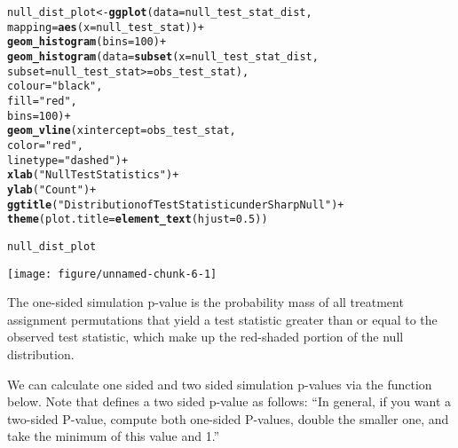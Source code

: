 \documentclass[11pt]{article}\usepackage[]{graphicx}\usepackage[]{color}
\makeatletter
\def\maxwidth{ %
  \ifdim\Gin@nat@width>\linewidth
    \linewidth
  \else
    \Gin@nat@width
  \fi
}
\newcommand{\hlnum}[1]{\textcolor[rgb]{0.686,0.059,0.569}{#1}}%
\newcommand{\hlstr}[1]{\textcolor[rgb]{0.192,0.494,0.8}{#1}}%
\newcommand{\hlopt}[1]{\textcolor[rgb]{0,0,0}{#1}}%
\newcommand{\hlstd}[1]{\textcolor[rgb]{0.345,0.345,0.345}{#1}}%
\newcommand{\hlkwb}[1]{\textcolor[rgb]{0.69,0.353,0.396}{#1}}%
\newcommand{\hlkwc}[1]{\textcolor[rgb]{0.333,0.667,0.333}{#1}}%
\newcommand{\hlkwd}[1]{\textcolor[rgb]{0.737,0.353,0.396}{\textbf{#1}}}%
\newenvironment{kframe}{%
 \def\at@end@of@kframe{}%
 \ifinner\ifhmode%
  \def\at@end@of@kframe{\end{minipage}}%
  \begin{minipage}{\columnwidth}%
 \fi\fi%
 \def\FrameCommand##1{\hskip\@totalleftmargin \hskip-\fboxsep
 \colorbox{shadecolor}{##1}\hskip-\fboxsep
     \hskip-\linewidth \hskip-\@totalleftmargin \hskip\columnwidth}%
 \MakeFramed {\advance\hsize-\width
   \@totalleftmargin\z@ \linewidth\hsize
   \@setminipage}}%
 {\par\unskip\endMakeFramed%
 \at@end@of@kframe}
\newenvironment{knitrout}{}{} %
\theoremstyle{newstyle}
\makeatother
\begin{document}
\begin{knitrout}
\begin{kframe}
\begin{alltt}
\hlstd{null_dist_plot} \hlkwb{<-} \hlkwd{ggplot}\hlstd{(}\hlkwc{data} \hlstd{= null_test_stat_dist,}
                         \hlkwc{mapping} \hlstd{=} \hlkwd{aes}\hlstd{(}\hlkwc{x} \hlstd{= null_test_stat))} \hlopt{+}
  \hlkwd{geom_histogram}\hlstd{(}\hlkwc{bins} \hlstd{=} \hlnum{100}\hlstd{)} \hlopt{+}
  \hlkwd{geom_histogram}\hlstd{(}\hlkwc{data} \hlstd{=} \hlkwd{subset}\hlstd{(}\hlkwc{x} \hlstd{= null_test_stat_dist,}
                               \hlkwc{subset} \hlstd{= null_test_stat} \hlopt{>=} \hlstd{obs_test_stat),}
                 \hlkwc{colour} \hlstd{=} \hlstr{"black"}\hlstd{,}
                 \hlkwc{fill} \hlstd{=} \hlstr{"red"}\hlstd{,}
                 \hlkwc{bins} \hlstd{=} \hlnum{100}\hlstd{)} \hlopt{+}
  \hlkwd{geom_vline}\hlstd{(}\hlkwc{xintercept} \hlstd{= obs_test_stat,}
             \hlkwc{color} \hlstd{=} \hlstr{"red"}\hlstd{,}
             \hlkwc{linetype} \hlstd{=} \hlstr{"dashed"}\hlstd{)} \hlopt{+}
  \hlkwd{xlab}\hlstd{(}\hlstr{"Null Test Statistics"}\hlstd{)} \hlopt{+}
  \hlkwd{ylab}\hlstd{(}\hlstr{"Count"}\hlstd{)} \hlopt{+}
  \hlkwd{ggtitle}\hlstd{(}\hlstr{"Distribution of Test Statistic under Sharp Null"}\hlstd{)} \hlopt{+}
  \hlkwd{theme}\hlstd{(}\hlkwc{plot.title} \hlstd{=} \hlkwd{element_text}\hlstd{(}\hlkwc{hjust} \hlstd{=} \hlnum{0.5}\hlstd{))}

\hlstd{null_dist_plot}
\end{alltt}
\end{kframe}
\texttt{[image: figure/unnamed-chunk-6-1]} 

\end{knitrout}

The one-sided simulation p-value is the probability mass of all treatment assignment permutations that yield a test statistic greater than or equal to the observed test statistic, which make up the red-shaded portion of the null distribution.

We can calculate one sided and two sided simulation p-values via the function below. Note that \citet[33]{rosenbaum2010} defines a two sided p-value as follows: ``In general, if you want a two-sided P-value, compute both one-sided P-values, double the smaller one, and take the minimum of this value and 1.''
\end{document}
